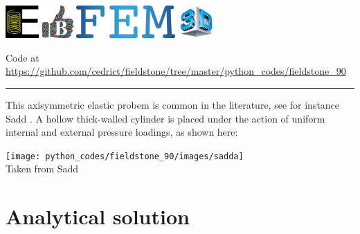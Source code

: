 \includegraphics[height=1.25cm]{images/pictograms/elasticity}
\includegraphics[height=1.25cm]{images/pictograms/benchmark}
\includegraphics[height=1.25cm]{images/pictograms/FEM}
\includegraphics[height=1.25cm]{images/pictograms/3d}




\begin{center}
Code at \url{https://github.com/cedrict/fieldstone/tree/master/python_codes/fieldstone_90}
\end{center}

\par\noindent\rule{\textwidth}{0.4pt}


This axisymmetric elastic probem is common in the literature, see for 
instance Sadd \cite{sadd14}. A hollow thick-walled cylinder is placed under the
action of uniform internal and external pressure loadings, as shown here:

\begin{center}
\texttt{[image: python\_codes/fieldstone\_90/images/sadda]}\\
{\captionfont Taken from Sadd \cite{sadd14}}
\end{center}


\section*{Analytical solution}

